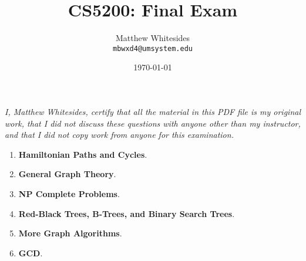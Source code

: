 \documentclass{article}
\title{CS5200: Final Exam} %
\author{Matthew Whitesides\\ \texttt{mbwxd4@umsystem.edu}} %
\date{\today} %
\begin{document}
  \maketitle %

  \textit{I, Matthew Whitesides, certify that all the material in this PDF file is my original work, that I did not discuss these questions with anyone other than my instructor, and that I did not copy work from anyone for this examination.}
 
  \begin{enumerate}
    \item \textbf{Hamiltonian Paths and Cycles}.
    \item \textbf{General Graph Theory}.
    \item \textbf{NP Complete Problems}.
    \item \textbf{Red-Black Trees, B-Trees, and Binary Search Trees}.
    \item \textbf{More Graph Algorithms}.
    \item \textbf{GCD}.
    
  \end{enumerate}  %
\end{document}
